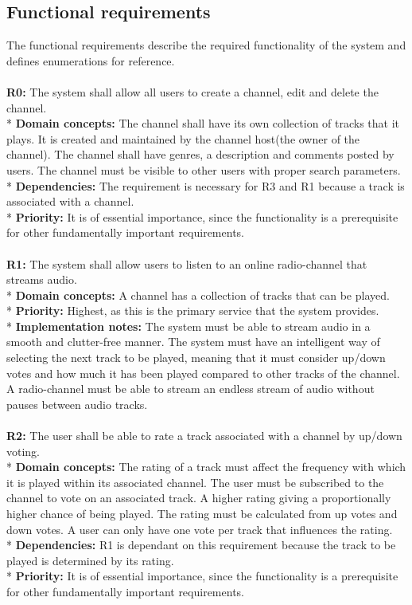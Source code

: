 \documentclass[a4paper,11pt,report]{article}
\begin{document}
\subsection{Functional requirements}
The functional requirements describe the required functionality of the system and defines enumerations for reference.
\\ \\
\textbf{R0:}
The system shall allow all users to create a channel, edit and delete the channel. \\*
\textbf{Domain concepts:}
The channel shall have its own collection of tracks that it plays. It is created and maintained by the channel host(the owner of the channel).
The channel shall have genres, a description and comments posted by users.
The channel must be visible to other users with proper search parameters. \\*
\textbf{Dependencies:} 
The requirement is necessary for R3 and R1 because a track is associated with a channel. \\*
\textbf{Priority:} 
It is of essential importance, since the functionality is a prerequisite for other fundamentally important requirements.
\\ \\

\textbf{R1:}
The system shall allow users to listen to an online radio-channel that streams audio. \\*
\textbf{Domain concepts:}
A channel has a collection of tracks that can be played. \\*
\textbf{Priority:}
Highest, as this is the primary service that the system provides. \\*
\textbf{Implementation notes:}
The system must be able to stream audio in a smooth and clutter-free manner. The system must have an intelligent way of selecting the next track to be played, meaning that it must consider up/down votes and how much it has been played compared to other tracks of the channel.
A radio-channel must be able to stream an endless stream of audio without pauses between audio tracks.
\\ \\

\textbf{R2:}
The user shall be able to rate a track associated with a channel by up/down voting. \\*
\textbf{Domain concepts:}
The rating of a track must affect the frequency with which it is played within its associated channel. The user must be subscribed to the channel to vote on an associated track.
A higher rating giving a proportionally higher chance of being played. The rating must be calculated from up votes and down votes. A user can only have one vote per track that influences the rating. \\*
\textbf{Dependencies:}
R1 is dependant on this requirement because the track to be played is determined by its rating.\\*
\textbf{Priority:}
It is of essential importance, since the functionality is a prerequisite for other fundamentally important requirements.
\\ \\
\end{document}

